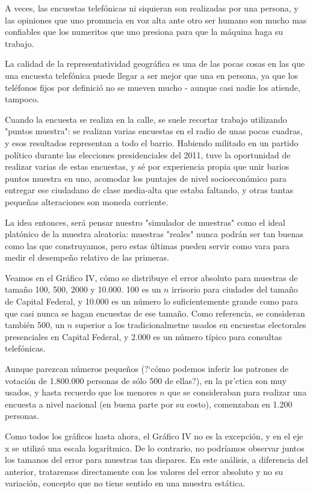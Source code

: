 \documentclass[12pt, a4paper]{article}
\begin{document}
A veces, las encuestas telef\'onicas ni siquieran son realizadas por una persona, y las opiniones que uno pronuncia en voz alta ante otro ser humano son mucho mas confiables que los numeritos que uno presiona para que la m\'aquina haga su trabajo.

La calidad de la representatividad geogr\'afica es una de las pocas cosas en las que una encuesta telef\'onica puede llegar a ser mejor que una en persona, ya que los tel\'efonos fijos por definici\'o no se mueven mucho - aunque casi nadie los atiende, tampoco.

Cuando la encuesta se realiza en la calle, se suele recortar trabajo utilizando "puntos muestra": se realizan varias encuestas en el radio de unas pocas cuadras, y esos resultados representan a todo el barrio. Habiendo militado en un partido pol\'itico durante las elecciones presidenciales del 2011, tuve la oportunidad de realizar varias de estas encuestas, y s\'e por experiencia propia que unir barios puntos muestra en uno, acomodar los puntajes de nivel socioecon\'omico para entregar ese ciudadano de clase media-alta que estaba faltando, y otras tantas peque\~nas alteraciones son moneda corriente.

La idea entonces, ser\'a pensar nuestro "simulador de muestras" como el ideal plat\'onico de la muestra aleatoria: muestras "reales" nunca podr\'an ser tan buenas como las que construyamos, pero estas \'ultimas pueden servir como vara para medir el desempe\~no relativo de las primeras.

Veamos en el Gr\'afico IV, c\'omo se distribuye el error absoluto para muestras de tama\~no 100, 500, 2000 y 10.000. 100 es un $n$ irrisorio para ciudades del tama\~no de Capital Federal, y 10.000 es un n\'umero lo suficientemente grande como para que casi nunca se hagan encuestas de ese tama\~no. Como referencia, se consideran tambi\'en 500, un $n$ superior a los tradicionalmetne usados en encuestas electorales presenciales en Capital Federal, y 2.000 es un n\'umero t\'ipico para consultas telef\'onicas. 

Aunque parezcan n\'umeros peque\~nos (?`c\'omo podemos inferir los patrones de votaci\'on de 1.800.000 personas de s\'olo 500 de ellas?), en la pr\a'ctica son muy usados, y hasta recuerdo que los menores $n$ que se consideraban para realizar una encuesta a nivel nacional (en buena parte por su costo), comenzaban en 1.200 personas.

Como todos los gr\'aficos hasta ahora, el Gr\'afico IV no es la excepci\'on, y en el eje x se utiliz\'o una escala logar\'itmica. De lo contrario, no podr\'iamos observar juntos los tamanos del error para muestras tan dispares. En este an\'alisis, a diferencia del anterior, trataremos directamente con los valores del error absoluto y no su variaci\'on, concepto que no tiene sentido en una muestra est\'atica.
\end{document}

